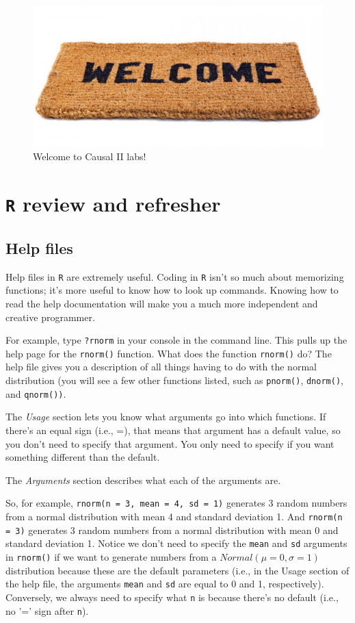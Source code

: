 \documentclass[answers]{exam}
\begin{document}
\begin{figure}
\begin{center}
\includegraphics[width=.4\textwidth]{welcome.jpg}
\caption{Welcome to Causal II labs!}
\end{center}
\end{figure}

\section{\texttt{R} review and refresher}
\subsection{Help files}

Help files in \texttt{R} are extremely useful. Coding in \texttt{R} isn't so much about memorizing functions; it's more useful to know how to look up commands. Knowing how to read the help documentation will make you a much more independent and creative programmer. 

\noindent For example, type \texttt{?rnorm} in your console in the command line. This pulls up the help page for the \texttt{rnorm()} function. What does the function \texttt{rnorm()} do? The help file gives you a description of all things having to do with the normal distribution (you will see a few other functions listed, such as \texttt{pnorm()}, \texttt{dnorm()}, and \texttt{qnorm())}.

\noindent The \textit{Usage} section lets you know what arguments go into which functions. If there's an equal sign (i.e., =), that means that argument has a default value, so you don't need to specify that argument. You only need to specify if you want something different than the default. 

\noindent The \textit{Arguments} section describes what each of the arguments are. 

\noindent So, for example, \texttt{rnorm(n = 3, mean = 4, sd = 1)} generates 3 random numbers from a normal distribution with mean 4 and standard deviation 1. And \texttt{rnorm(n = 3)} generates 3 random numbers from a normal distribution with mean 0 and standard deviation 1. Notice we don't need to specify the \texttt{mean} and \texttt{sd} arguments in \texttt{rnorm()} if we want to generate numbers from a $Normal(\mu = 0, \sigma = 1)$ distribution because these are the default parameters (i.e., in the Usage section of the help file, the arguments \texttt{mean} and \texttt{sd} are equal to 0 and 1, respectively). Conversely, we always need to specify what \texttt{n} is because there's no default (i.e., no '=' sign after \texttt{n}).
\end{document}
